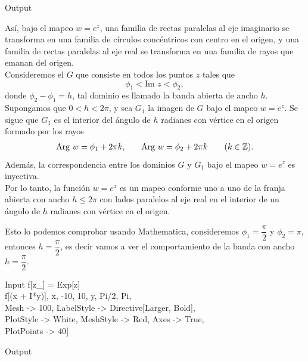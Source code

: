 \begin{mmaCell}[moregraphics={moreig={scale=0.5}}]{Output}
\end{mmaCell}
Así, bajo el mapeo $w = e^z$, una familia de rectas paralelas al eje imaginario se transforma en una familia de círculos concéntricos con centro en el origen, y una familia de rectas paralelas al eje real se transforma en una familia de rayos que emanan del origen.\\
Consideremos el $G$ que consiste en todos los puntos  $z$ tales que 
$$\phi_1<\mbox{Im }z<\phi_2,$$
donde $\phi_2-\phi_1=h$, tal dominio es llamado la banda  abierta de ancho $h$. Supongamos que $0<h<2\pi$, y sea $G_1$ la imagen de $G$ bajo el mapeo $w=e^z$. Se sigue que $G_1$ es el interior del ángulo de $h$ radianes con vértice en el origen formado por los rayos
\[
	\begin{array}{ccccc}
		\mbox{Arg }w=\phi_1+2\pi k,&&\mbox{Arg }w=\phi_2+2\pi k&&(k\in \mathbb{Z}).
	\end{array}
\]
Además, la correspondencia entre los dominios $G$ y $G_1$ bajo el mapeo $w=e^z$ es inyectiva.\\
Por lo tanto, la función $w=e^z$ es un mapeo conforme uno a uno de la franja abierta con ancho $h\leq 2\pi$ con lados paralelos al eje real en el interior de un ángulo de $h$ radianes con vértice en el origen.

\begin{Ejem}
	Esto lo podemos comprobar usando Mathematica, consideremos $\phi_1=\dfrac{\pi}{2}$ y $\phi_2=\pi$, entonces $h=\dfrac{\pi}{2}$, es decir vamos a ver el comportamiento de la banda con ancho $h=\dfrac{\pi}{2}$.
	\begin{mmaCell}{Input}
		f[z_] = Exp[z] \\f[(x + I*y)], {x, -10, 10}, {y, Pi/2, Pi},\\Mesh -> 100, LabelStyle -> Directive[Larger, Bold],\\PlotStyle -> White, MeshStyle -> Red, Axes -> True,\\PlotPoints -> 40]
	\end{mmaCell}
	
	\begin{mmaCell}[moregraphics={moreig={scale=0.5}}]{Output}
	\end{mmaCell}
\end{Ejem}

